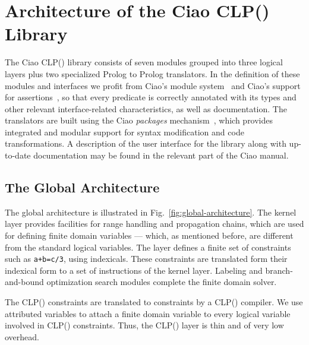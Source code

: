 \documentclass{llncs}
\newcommand{\clpfd}{CLP()\xspace}
\newcommand{\fd}{\xspace}
\begin{document}
\section{Architecture of the Ciao \clpfd Library}
\label{sec:structure}

The Ciao \clpfd library consists of seven modules grouped into three
logical layers plus two specialized Prolog to Prolog translators. In
the definition of these modules and interfaces we profit from Ciao's
module system~\cite{ciao-modules-cl2000} and Ciao's support for
assertions~\cite{ciaopp-sas03-journal-scp,hermenegildo11:ciao-design-tplp},
so that every predicate is correctly annotated with its types and
other relevant interface-related characteristics, as well as
documentation.  The translators are built using the Ciao
\emph{packages} mechanism~\cite{ciao-modules-cl2000}, which provides
integrated and modular support for syntax modification and code
transformations.
A description of the user interface for the library along with
up-to-date documentation may be found in the relevant part of the Ciao
manual.


\subsection{The Global Architecture}

The global architecture is illustrated in
Fig.~\ref{fig:global-architecture}. The kernel layer provides
facilities for range handling and propagation chains, which are used
for defining finite domain variables --- which, as mentioned before,
are different from the standard logical variables. The \fd layer
defines a finite set of constraints such as \verb!a+b=c/3!, using
indexicals. These constraints are translated form their indexical form
to a set of instructions of the kernel layer. Labeling and
branch-and-bound optimization search modules complete the finite
domain solver.

The \clpfd constraints are translated to \fd constraints by a \clpfd
compiler. We use attributed variables to attach a finite domain
variable to every logical variable involved in \clpfd
constraints. Thus, the \clpfd layer is thin and of very low overhead.
\end{document}
